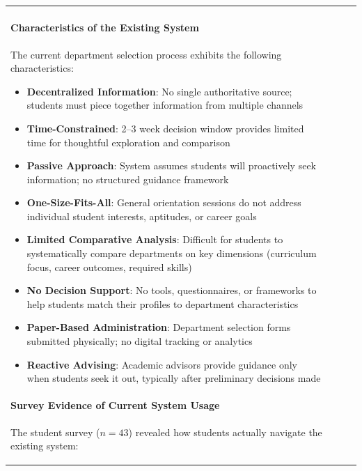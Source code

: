 \documentclass[12pt, a4paper]{article}
\begin{document}
\begin{itemize}[leftmargin=1.5em, itemsep=3pt]
\begin{table}[H]
\begin{tabularx}{\textwidth}{>{\raggedright\arraybackslash}p{0.8cm}>{\raggedright\arraybackslash}p{3.5cm}>{\raggedright\arraybackslash}X>{\raggedright\arraybackslash}p{2.5cm}}
\paragraph{Characteristics of the Existing System}

The current department selection process exhibits the following characteristics:

\begin{itemize}[leftmargin=1.5em, itemsep=3pt]
    \item \textbf{Decentralized Information}: No single authoritative source; students must piece together information from multiple channels
    
    \item \textbf{Time-Constrained}: 2--3 week decision window provides limited time for thoughtful exploration and comparison
    
    \item \textbf{Passive Approach}: System assumes students will proactively seek information; no structured guidance framework
    
    \item \textbf{One-Size-Fits-All}: General orientation sessions do not address individual student interests, aptitudes, or career goals
    
    \item \textbf{Limited Comparative Analysis}: Difficult for students to systematically compare departments on key dimensions (curriculum focus, career outcomes, required skills)
    
    \item \textbf{No Decision Support}: No tools, questionnaires, or frameworks to help students match their profiles to department characteristics
    
    \item \textbf{Paper-Based Administration}: Department selection forms submitted physically; no digital tracking or analytics
    
    \item \textbf{Reactive Advising}: Academic advisors provide guidance only when students seek it out, typically after preliminary decisions made
\end{itemize}

\paragraph{Survey Evidence of Current System Usage}

The student survey ($n = 43$) revealed how students actually navigate the existing system:


\end{tabularx}
\end{table}
\end{itemize}
\end{document}
